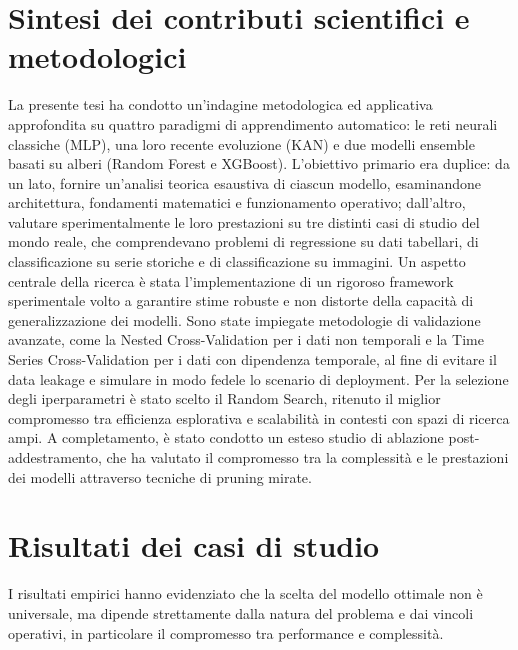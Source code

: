 \documentclass[a4paper,12pt]{report}
\begin{document}
	\section*{Sintesi dei contributi scientifici e metodologici}
	La presente tesi ha condotto un'indagine metodologica ed applicativa approfondita su quattro paradigmi di apprendimento automatico: le reti neurali classiche (MLP), una loro recente evoluzione (KAN) e due modelli ensemble basati su alberi (Random Forest e XGBoost). L'obiettivo primario era duplice: da un lato, fornire un'analisi teorica esaustiva di ciascun modello, esaminandone architettura, fondamenti matematici e funzionamento operativo; dall'altro, valutare sperimentalmente le loro prestazioni su tre distinti casi di studio del mondo reale, che comprendevano problemi di regressione su dati tabellari, di classificazione su serie storiche e di classificazione su immagini. Un aspetto centrale della ricerca è stata l'implementazione di un rigoroso framework sperimentale volto a garantire stime robuste e non distorte della capacità di generalizzazione dei modelli. Sono state impiegate metodologie di validazione avanzate, come la Nested Cross-Validation per i dati non temporali e la Time Series Cross-Validation per i dati con dipendenza temporale, al fine di evitare il data leakage e simulare in modo fedele lo scenario di deployment. Per la selezione degli iperparametri è stato scelto il Random Search, ritenuto il miglior compromesso tra efficienza esplorativa e scalabilità in contesti con spazi di ricerca ampi. A completamento, è stato condotto un esteso studio di ablazione post-addestramento, che ha valutato il compromesso tra la complessità e le prestazioni dei modelli attraverso tecniche di pruning mirate.   
	
	\section*{Risultati dei casi di studio}
	I risultati empirici hanno evidenziato che la scelta del modello ottimale non è universale, ma dipende strettamente dalla natura del problema e dai vincoli operativi, in particolare il compromesso tra performance e complessità.
	
\end{document}

